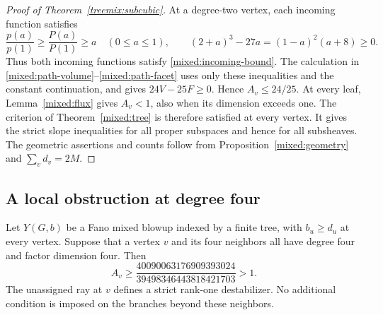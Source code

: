 \begin{proof}[Proof of Theorem~\ref{treemix:subcubic}]
At a degree-two vertex, each incoming function satisfies
\[
 \frac{p(a)}{p(1)}\ge\frac{P(a)}{P(1)}\ge a
 \quad(0\le a\le1),\qquad
 (2+a)^3-27a=(1-a)^2(a+8)\ge0.
\]
Thus both incoming functions satisfy \eqref{mixed:incoming-bound}.
The calculation in \eqref{mixed:path-volume}--\eqref{mixed:path-facet}
uses only these inequalities and the constant continuation, and gives
$24V-25F\ge0$.
Hence $A_v\le24/25$. At every leaf, Lemma~\ref{mixed:flux} gives
$A_v<1$, also when its dimension exceeds one. The criterion of Theorem~\ref{mixed:tree} is therefore satisfied at
every vertex. It gives the strict slope inequalities for all proper
subspaces and hence for all subsheaves. The geometric assertions
and counts follow from Proposition~\ref{mixed:geometry} and
$\sum_vd_v=2M$.
\end{proof}

\subsection{A local obstruction at degree four}

\begin{theorem}\label{treemix:degree-four}
Let $Y(G,b)$ be a Fano mixed blowup indexed by a finite tree, with
$b_u\ge d_u$ at every vertex. Suppose that a vertex $v$ and its four
neighbors all have degree four and factor dimension four. Then
\begin{equation}\label{treemix:four-bound}
 A_v\ge\frac{40090063176909393024}{39498346443818421703}>1.
\end{equation}
The unassigned ray at $v$ defines a strict rank-one destabilizer.
No additional condition is imposed on the branches beyond these neighbors.
\end{theorem}

